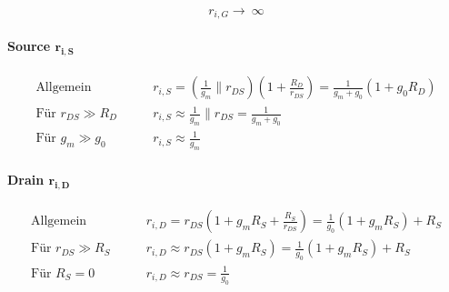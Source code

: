 \[
    r_{i, G} \to\ \infty
\]


\paragraph{Source $\bm{r_{i,S}}$}

\vspace{-0.3cm}

\begin{align*}
    \text{Allgemein}            & \qquad r_{i, S} = \left( \frac{1}{g_m} \parallel r_{DS} \right) \left( 1 + \frac{R_D}{r_{DS}} \right) = \frac{1}{g_m + g_0} (1 + g_0 R_D) \\
    \text{Für } r_{DS} \gg R_D  & \qquad r_{i, S} \approx \frac{1}{g_m} \parallel r_{DS} = \frac{1}{g_m + g_0} \\
    \text{Für } g_m \gg g_0     & \qquad r_{i, S} \approx \frac{1}{g_m}
\end{align*}


\paragraph{Drain $\bm{r_{i,D}}$}

\vspace{-0.3cm}

\begin{align*}
    \text{Allgemein}            & \qquad r_{i, D} = r_{DS} \left( 1 + g_m R_S + \frac{R_S}{r_{DS}} \right) = \frac{1}{g_0} (1+g_m R_S) + R_S \\
    \text{Für } r_{DS} \gg R_S  & \qquad r_{i, D} \approx r_{DS} \left( 1 + g_m R_S \right) = \frac{1}{g_0} (1+g_m R_S) + R_S \\
    \text{Für } R_S = 0         & \qquad r_{i, D} \approx r_{DS} = \frac{1}{g_0}
\end{align*}

\columnbreak


